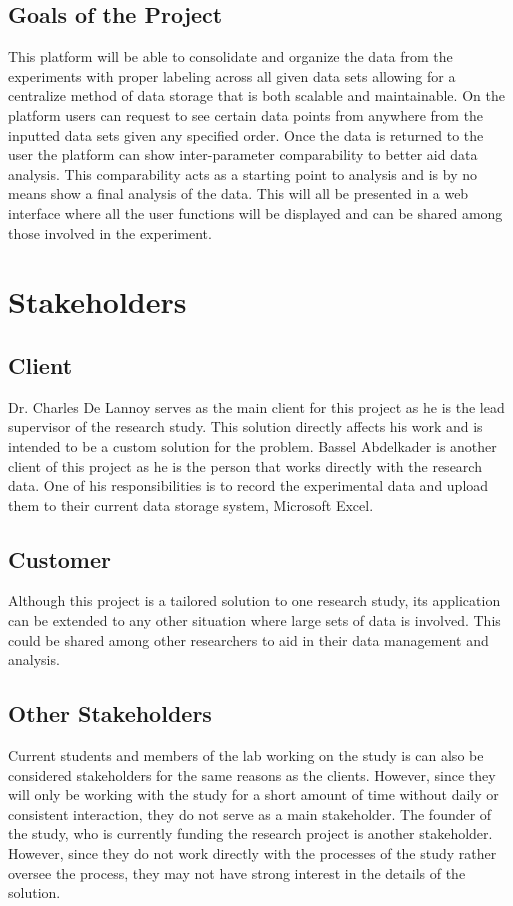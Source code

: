 \documentclass[12pt]{article}
\begin{document}
\subsection{Goals of the Project}
This platform will be able to consolidate and organize the data from the
experiments with proper labeling across all given data sets allowing for a
centralize method of data storage that is both scalable and maintainable. On the
platform users can request to see certain data points from anywhere from the
inputted data sets given any specified order. Once the data is returned to the
user the platform can show inter-parameter comparability to better aid data
analysis. This comparability acts as a starting point to analysis and is by no
means show a final analysis of the data. This will all be presented in a web
interface where all the user functions will be displayed and can be shared among
those involved in the experiment.   
\section{Stakeholders}

\subsection{Client}
Dr. Charles De Lannoy serves as the main client for this project as he is the
lead supervisor of the research study. This solution directly affects his work and
is intended to be a custom solution for the problem. Bassel Abdelkader is
another client of this project as he is the person that works directly with the
research data. One of his responsibilities is to record the experimental data and
upload them to their current data storage system, Microsoft Excel. 
\subsection{Customer}
Although this project is a tailored solution to one research study, its
application can be extended to any other situation where large sets of data is involved. 
This could be shared among other researchers to aid in their data management and analysis. 
\subsection{Other Stakeholders}
Current students and members of the lab working on the study is can also be
considered stakeholders for the same reasons as the clients. However, since they
will only be working with the study for a short amount of time without daily or
consistent interaction, they do not serve as a main stakeholder. The founder of
the study, who is currently funding the research project is another stakeholder.
However, since they do not work directly with the processes of the study rather
oversee the process, they may not have strong interest in the details of the solution. 
\end{document}

